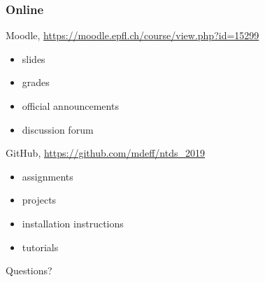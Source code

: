 \documentclass[aspectratio=169]{beamer}
\begin{document}

\begin{frame}
	\frametitle{Online}
	\begin{block}{Moodle, \url{https://moodle.epfl.ch/course/view.php?id=15299}}
	\begin{minipage}{0.25\linewidth}
	\begin{itemize}
		\item slides
		\item grades
	\end{itemize}
	\end{minipage}
	\begin{minipage}{0.45\linewidth}
	\begin{itemize}
		\item official announcements
		\item discussion forum
	\end{itemize}
	\end{minipage}
	\end{block}
	\vspace{1em}
	\begin{block}{GitHub, \url{https://github.com/mdeff/ntds_2019}}
	\begin{minipage}{0.25\linewidth}
	\begin{itemize}
		\item assignments
		\item projects
	\end{itemize}
	\end{minipage}
	\begin{minipage}{0.45\linewidth}
	\begin{itemize}
		\item installation instructions
		\item tutorials
	\end{itemize}
	\end{minipage}
	\end{block}
	\vfill
	\begin{center}
		\Huge Questions?
	\end{center}
\end{frame}

\end{document}
